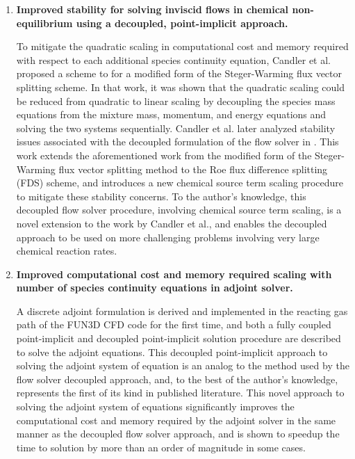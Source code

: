 \begin{enumerate}

  \item {\bf Improved stability for solving inviscid flows in chemical
    non-equilibrium using a decoupled, point-implicit approach.}

To mitigate the quadratic scaling in computational cost and memory required with
respect to each additional species continuity equation, Candler et
al.\cite{candler} proposed a scheme to for a modified form of the Steger-Warming
flux vector splitting scheme\cite{MacCormack,Steger}. In that work, it was shown
that the quadratic scaling could be reduced from quadratic to linear scaling by
decoupling the species mass equations from the mixture mass, momentum, and
energy equations and solving the two systems sequentially. Candler et
al.\cite{candler2013analysis} later analyzed stability issues associated with
the decoupled formulation of the flow solver in \cite{candler}. This work
extends the aforementioned work from the modified form of the Steger-Warming
flux vector splitting method to the Roe flux difference splitting (FDS) scheme,
and introduces a new chemical source term scaling procedure to mitigate these
stability concerns.  To the author's knowledge, this decoupled flow solver
procedure, involving chemical source term scaling, is a novel extension to the
work by Candler et al.\cite{candler}, and enables the decoupled approach to be
used on more challenging problems involving very large chemical reaction rates.

  \item {\bf Improved computational cost and memory required scaling with number of
    species continuity equations in adjoint solver.}

A discrete adjoint formulation is derived and implemented in the reacting gas
path of the FUN3D CFD code\cite{biedron2016fun3d} for the first time, and both a
fully coupled point-implicit and decoupled point-implicit solution procedure are
described to solve the adjoint equations.  This decoupled point-implicit
approach to solving the adjoint system of equation is an analog to the method
used by the flow solver decoupled approach, and, to the best of the author's
knowledge, represents the first of its kind in published literature.  This novel
approach to solving the adjoint system of equations significantly improves the
computational cost and memory required by the adjoint solver in the same manner
as the decoupled flow solver approach, and is shown to speedup the time to
solution by more than an order of magnitude in some cases.


\end{enumerate}

